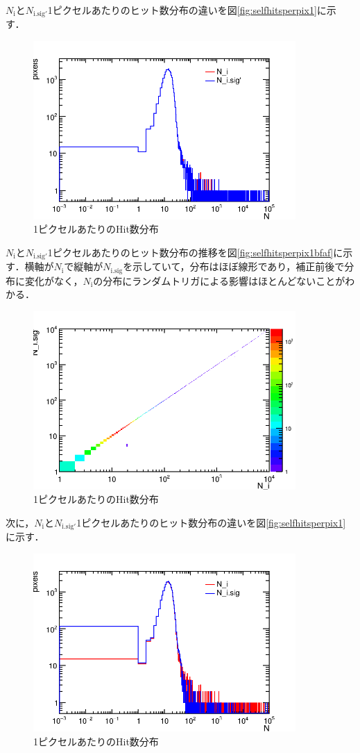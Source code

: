 $N_{\mathrm{i}}$と$N_{\mathrm{i.sig'}}$1ピクセルあたりのヒット数分布の違いを図\ref{fig:selfhitsperpix1}に示す．
\begin{figure}[h]
  \centering
  \includegraphics[width=10cm]{./figure/selfhitperpix1.png}
  \caption{1ピクセルあたりのHit数分布}
  \label{fig:selfhitfreq}
\end{figure}

$N_{\mathrm{i}}$と$N_{\mathrm{i.sig'}}$1ピクセルあたりのヒット数分布の推移を図\ref{fig:selfhitsperpix1bfaf}に示す．横軸が$N_{\mathrm{i}}$で縦軸が$N_{\mathrm{i.sig}}$を示していて，分布はほぼ線形であり，補正前後で分布に変化がなく，$N_{\mathrm{i}}$の分布にランダムトリガによる影響はほとんどないことがわかる．
\begin{figure}[h]
  \centering
  \includegraphics[width=10cm]{./figure/selfhitperpixbfaf1.png}
  \caption{1ピクセルあたりのHit数分布}
  \label{fig:selfhitfreq}
\end{figure}

次に，$N_{\mathrm{i}}$と$N_{\mathrm{i.sig'}}$1ピクセルあたりのヒット数分布の違いを図\ref{fig:selfhitsperpix1}に示す．
\begin{figure}[h]
  \centering
  \includegraphics[width=10cm]{./figure/selfhitperpix.png}
  \caption{1ピクセルあたりのHit数分布}
  \label{fig:selfhitfreq}
\end{figure}

